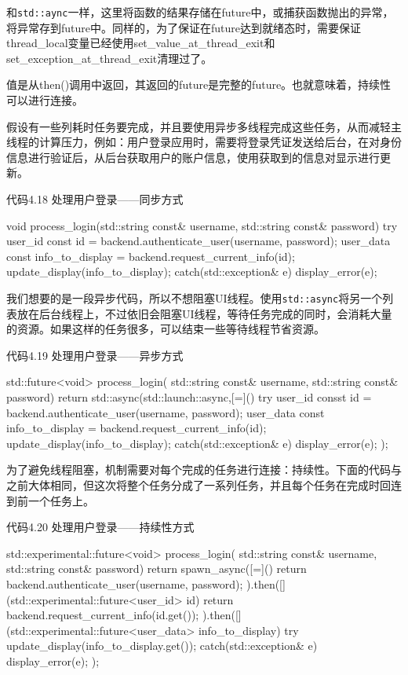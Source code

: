 和\texttt{std::aync}一样，这里将函数的结果存储在future中，或捕获函数抛出的异常，将异常存到future中。同样的，为了保证在future达到就绪态时，需要保证thread\_local变量已经使用set\_value\_at\_thread\_exit和set\_exception\_at\_thread\_exit清理过了。

值是从then()调用中返回，其返回的future是完整的future。也就意味着，持续性可以进行连接。


假设有一些列耗时任务要完成，并且要使用异步多线程完成这些任务，从而减轻主线程的计算压力，例如：用户登录应用时，需要将登录凭证发送给后台，在对身份信息进行验证后，从后台获取用户的账户信息，使用获取到的信息对显示进行更新。

代码4.18 处理用户登录——同步方式

\begin{cpp}
void process_login(std::string const& username, std::string const& password)
{
  try{
    user_id const id = backend.authenticate_user(username, password);
    user_data const info_to_display = backend.request_current_info(id);
    update_display(info_to_display);
  } catch(std::exception& e){
    display_error(e);
  }
}
\end{cpp}

我们想要的是一段异步代码，所以不想阻塞UI线程。使用\texttt{std::async}将另一个列表放在后台线程上，不过依旧会阻塞UI线程，等待任务完成的同时，会消耗大量的资源。如果这样的任务很多，可以结束一些等待线程节省资源。

代码4.19 处理用户登录——异步方式

\begin{cpp}
std::future<void> process_login(
  std::string const& username, std::string const& password)
{
  return std::async(std::launch::async,[=](){
    try{
      user_id consst id = backend.authenticate_user(username, password);
      user_data const info_to_display =
        backend.request_current_info(id);
      update_display(info_to_display);
    } catch(std::exception& e){
      display_error(e);
    }
  });
}
\end{cpp}

为了避免线程阻塞，机制需要对每个完成的任务进行连接：持续性。下面的代码与之前大体相同，但这次将整个任务分成了一系列任务，并且每个任务在完成时回连到前一个任务上。

代码4.20 处理用户登录——持续性方式

\begin{cpp}
std::experimental::future<void> process_login(
  std::string const& username, std::string const& password)
{
  return spawn_async([=](){
    return backend.authenticate_user(username, password);
  }).then([](std::experimental::future<user_id> id){
    return backend.request_current_info(id.get());
  }).then([](std::experimental::future<user_data> info_to_display){
    try{
      update_display(info_to_display.get());
    } catch(std::exception& e){
      display_error(e);
    }
  });
}
\end{cpp}

